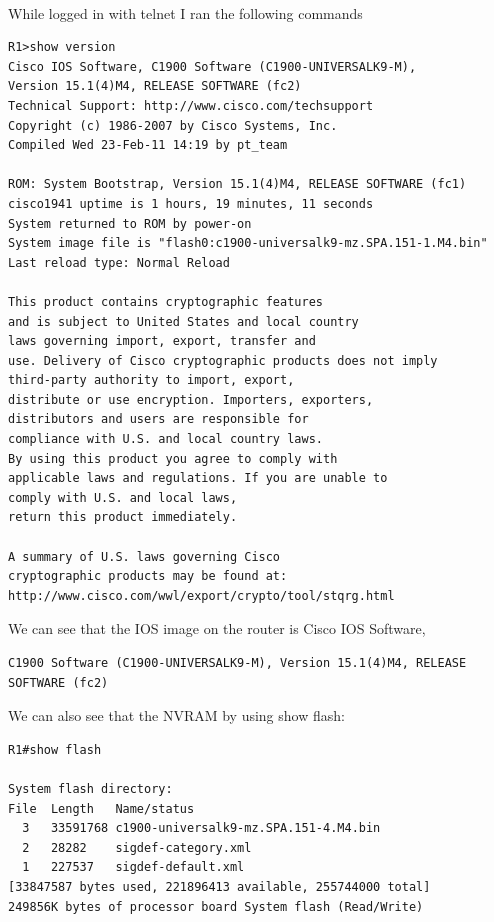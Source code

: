 \documentclass[../EngineeringJournal_CDavis.tex]{subfiles}
\begin{document}
\\While logged in with telnet I ran the following commands
\begin{mdframed}
\scriptsize
\begin{verbatim}
R1>show version
Cisco IOS Software, C1900 Software (C1900-UNIVERSALK9-M), 
Version 15.1(4)M4, RELEASE SOFTWARE (fc2)
Technical Support: http://www.cisco.com/techsupport
Copyright (c) 1986-2007 by Cisco Systems, Inc.
Compiled Wed 23-Feb-11 14:19 by pt_team

ROM: System Bootstrap, Version 15.1(4)M4, RELEASE SOFTWARE (fc1)
cisco1941 uptime is 1 hours, 19 minutes, 11 seconds
System returned to ROM by power-on
System image file is "flash0:c1900-universalk9-mz.SPA.151-1.M4.bin"
Last reload type: Normal Reload

This product contains cryptographic features 
and is subject to United States and local country 
laws governing import, export, transfer and
use. Delivery of Cisco cryptographic products does not imply
third-party authority to import, export, 
distribute or use encryption. Importers, exporters, 
distributors and users are responsible for
compliance with U.S. and local country laws. 
By using this product you agree to comply with 
applicable laws and regulations. If you are unable to 
comply with U.S. and local laws, 
return this product immediately.

A summary of U.S. laws governing Cisco 
cryptographic products may be found at:
http://www.cisco.com/wwl/export/crypto/tool/stqrg.html

\end{verbatim}
\normalsize
\end{mdframed}

We can see that  the IOS image on the router is Cisco IOS Software,

\begin{mdframed}
\scriptsize
\begin{verbatim}
C1900 Software (C1900-UNIVERSALK9-M), Version 15.1(4)M4, RELEASE SOFTWARE (fc2)
\end{verbatim}
\normalsize
\end{mdframed}

We can also see that the NVRAM by using show flash:

\begin{mdframed}
\scriptsize
\begin{verbatim}
R1#show flash 

System flash directory:
File  Length   Name/status
  3   33591768 c1900-universalk9-mz.SPA.151-4.M4.bin
  2   28282    sigdef-category.xml
  1   227537   sigdef-default.xml
[33847587 bytes used, 221896413 available, 255744000 total]
249856K bytes of processor board System flash (Read/Write)
\end{verbatim}
\normalsize
\end{mdframed}
\end{document}
